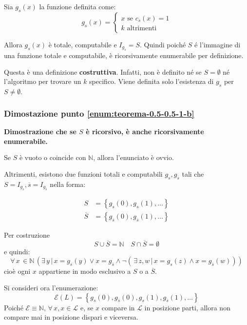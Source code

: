 \documentclass[italian, 10pt]{article}
\begin{document}
Sia \(g_s(x)\) la funzione definita come:
\[ g_s(x) = \begin{cases}
    x \text{ se } c_s(x) = 1 \\
    k \text{ altrimenti }
  \end{cases}
\]

Allora \(g_s(x)\) è totale, computabile e \(I_{g_s} = S\).
Quindi poiché \(S\) \'e l'immagine di una funzione totale e computabile, è ricorsivamente enumerabile per definizione.

\bigskip
Questa è una definizione \textbf{costruttiva}.
Infatti, non è definito né se \(S = \emptyset\) né l'algoritmo per trovare un \(k\) specifico.
Viene definita solo l'esistenza di \(g_s\) per \(S \neq \emptyset\).

\subsubsection{Dimostazione punto \ref{enum:teorema-0.5-0.5-1-b}}

\textbf{Dimostrazione che se \(S\) è ricorsivo, è anche ricorsivamente enumerabile.}

Se \(S\) è vuoto o coincide con \(\mathbb{N}\), allora l'enunciato è ovvio.

Altrimenti, esistono due funzioni totali e computabili \(g_s, g_{\overline{s}}\) tali che \(S = I_{g_s}, \overline{s} = I_{g_{\overline{s}}}\) nella forma:

\begin{align*}
  S            & = \left\{ g_s(0), g_s(1), \ldots \right\}                           \\
  \overline{S} & = \left\{ g_{\overline{s}}(0), g_{\overline{s}}(1), \ldots \right\}
\end{align*}

Per costruzione
\[ S \cup \overline{S} = \mathbb{N} \quad S \cap \overline{S} = \emptyset \]
e quindi:
\[ \forall \, x \, \in \mathbb{N} \, (\exists \, y \, | \, x = g_s(y) \lor x = g_{\overline{s}} \land \lnot (\, \exists \, z, w \, | \, x = g_s(z) \land x = g_{\overline{s}}(w) )) \]
cioè ogni \(x\) appartiene in modo esclusivo a \(S\) o a \(\overline{S}\).

\bigskip
Si consideri ora l'enumerazione:
\[ \mathscr{E}({L}) = \left\{ g_s(0), g_{\overline{s}}(0),  g_s(1), g_{\overline{s}}(1), \ldots \right\} \]
Poiché \(\mathscr{E} \equiv \mathbb{N}\), \(\forall \, x, x \in \mathscr{L}\) e, se \(x\) compare in \(\mathscr{L}\) in posizione parti, allora non compare mai in posizione dispari e viceversa.
\end{document}
